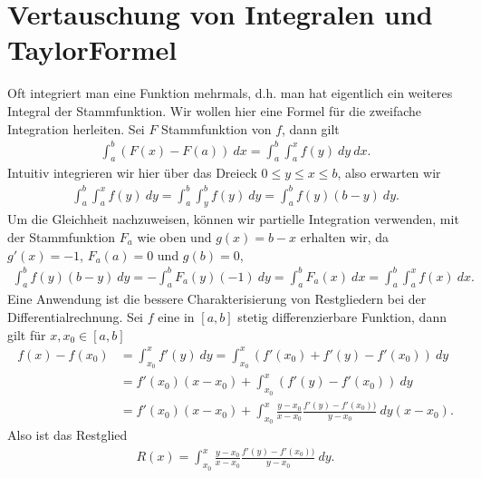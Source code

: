 \documentclass[letterpaper,10pt,english]{jupyterBook}
\begin{document}
\section{Vertauschung von Integralen und Taylor\sphinxhyphen{}Formel}
\label{\detokenize{integration/vertauschen:vertauschung-von-integralen-und-taylor-formel}}\label{\detokenize{integration/vertauschen::doc}}
Oft integriert man eine Funktion mehrmals, d.h. man hat eigentlich ein weiteres Integral der Stammfunktion. Wir wollen hier eine Formel für die zweifache Integration herleiten. Sei \(F\) Stammfunktion von \(f\), dann gilt
\begin{equation*}
\begin{split} \int_a^b (F(x) - F(a))~dx = \int_a^b \int_a^x f(y)~dy~dx.\end{split}
\end{equation*}
Intuitiv integrieren wir hier über das Dreieck \(0 \leq y \leq x \leq b\), also erwarten wir
\begin{equation*}
\begin{split} \int_a^b \int_a^x f(y)~dy = \int_a^b \int_y^b f(y)~dy = \int_a^b f(y) (b-y)~dy.\end{split}
\end{equation*}
Um die Gleichheit nachzuweisen, können wir partielle Integration verwenden, mit der Stammfunktion \(F_a\) wie oben und \(g(x) = b-x\) erhalten wir, da \(g'(x)=-1\), \(F_a(a) = 0 \) und \(g(b) =0\),
\begin{equation*}
\begin{split} \int_a^b f(y) (b-y)~dy = - \int_a^b F_a(y) (-1)~dy = \int_a^b F_a(x)~dx =  \int_a^b \int_a^x f(x)~dx .\end{split}
\end{equation*}
Eine Anwendung ist die bessere Charakterisierung von Restgliedern bei der Differentialrechnung. Sei \(f\) eine in \([a,b]\) stetig differenzierbare Funktion, dann gilt für \(x,x_0 \in [a,b]\)
\begin{align*}
f(x) - f(x_0) &= \int_{x_0}^x f'(y)~dy =  \int_{x_0}^x (f'(x_0) + f'(y) -f'(x_0))~dy \\
&= f'(x_0) (x-x_0) + \int_{x_0}^x ( f'(y) -f'(x_0))~dy \\&= f'(x_0) (x-x_0) + \int_{x_0}^x \frac{y-x_0}{x-x_0} \frac{ f'(y) -f'(x_0))}{y-x_0}~dy  (x-x_0) .
\end{align*}
Also ist das Restglied
\begin{equation*}
\begin{split}R(x) = \int_{x_0}^x \frac{y-x_0}{x-x_0} \frac{ f'(y) -f'(x_0))}{y-x_0}~dy .\end{split}
\end{equation*}
\end{document}
